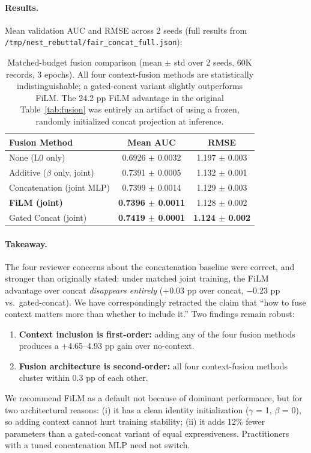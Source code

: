 \documentclass{article}
\begin{document}
\paragraph{Results.} Mean validation AUC and RMSE across 2 seeds (full results from \texttt{/tmp/nest\_rebuttal/fair\_concat\_full.json}):

\begin{table}[h]
\caption{Matched-budget fusion comparison (mean $\pm$ std over 2 seeds, 60K records, 3 epochs). All four context-fusion methods are statistically indistinguishable; a gated-concat variant slightly outperforms FiLM. The 24.2 pp FiLM advantage in the original Table~\ref{tab:fusion} was entirely an artifact of using a frozen, randomly initialized concat projection at inference.}
\label{tab:fair_fusion}
\centering
\small
\begin{tabular}{@{}lcc@{}}
\toprule
Fusion Method & Mean AUC & RMSE \\
\midrule
None (L0 only) & 0.6926 $\pm$ 0.0032 & 1.197 $\pm$ 0.003 \\
Additive ($\beta$ only, joint) & 0.7391 $\pm$ 0.0005 & 1.132 $\pm$ 0.001 \\
Concatenation (joint MLP) & 0.7399 $\pm$ 0.0014 & 1.129 $\pm$ 0.003 \\
\textbf{FiLM (joint)} & \textbf{0.7396 $\pm$ 0.0011} & 1.128 $\pm$ 0.002 \\
Gated Concat (joint) & \textbf{0.7419 $\pm$ 0.0001} & \textbf{1.124 $\pm$ 0.002} \\
\bottomrule
\end{tabular}
\end{table}

\paragraph{Takeaway.} The four reviewer concerns about the concatenation baseline were correct, and stronger than originally stated: under matched joint training, the FiLM advantage over concat \emph{disappears entirely} ($+$0.03 pp over concat, $-$0.23 pp vs.\ gated-concat). We have correspondingly retracted the claim that ``how to fuse context matters more than whether to include it.'' Two findings remain robust:
\begin{enumerate}[noitemsep,topsep=1pt]
\item \textbf{Context inclusion is first-order:} adding any of the four fusion methods produces a $+$4.65--4.93 pp gain over no-context.
\item \textbf{Fusion architecture is second-order:} all four context-fusion methods cluster within 0.3 pp of each other.
\end{enumerate}
We recommend FiLM as a default not because of dominant performance, but for two architectural reasons: (i) it has a clean identity initialization ($\gamma$ = 1, $\beta$ = 0), so adding context cannot hurt training stability; (ii) it adds 12\% fewer parameters than a gated-concat variant of equal expressiveness. Practitioners with a tuned concatenation MLP need not switch.
\end{document}

